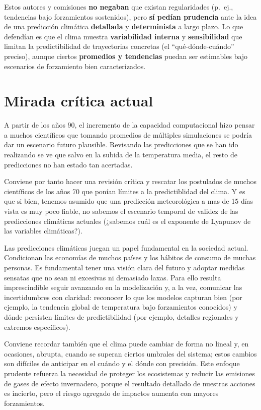 \documentclass[
  11pt,
  a4paper,
  DIV=11,
  numbers=noendperiod]{scrreprt}
\begin{document}
Estos autores y comisiones \textbf{no negaban} que existan regularidades
(p.~ej., tendencias bajo forzamientos sostenidos), pero \textbf{sí
pedían prudencia} ante la idea de una predicción climática
\textbf{detallada} y \textbf{determinista} a largo plazo. Lo que
defendían es que el clima muestra \textbf{variabilidad interna} y
\textbf{sensibilidad} que limitan la predictibilidad de trayectorias
concretas (el ``qué-dónde-cuándo'' preciso), aunque ciertos
\textbf{promedios y tendencias} puedan ser estimables bajo escenarios de
forzamiento bien caracterizados.

\section{Mirada crítica actual}\label{mirada-cruxedtica-actual}

A partir de los años 90, el incremento de la capacidad computacional
hizo pensar a muchos científicos que tomando promedios de múltiples
simulaciones se podría dar un escenario futuro plausible. Revisando las
predicciones que se han ido realizando se ve que salvo en la subida de
la temperatura media, el resto de predicciones no han estado tan
acertadas.

Conviene por tanto hacer una revisión crítica y rescatar los postulados
de muchos científicos de los años 70 que ponían límites a la
predictiblidad del clima. Y es que si bien, tenemos asumido que una
predicción meteorológica a mas de 15 días vista es muy poco fiable, no
sabemos el escenario temporal de validez de las predicciones climáticas
actuales (¿sabemos cuál es el exponente de Lyapunov de las variables
climáticas?).

Las predicciones climáticas juegan un papel fundamental en la sociedad
actual. Condicionan las economías de muchos países y los hábitos de
consumo de muchas personas. Es fundamental tener una visión clara del
futuro y adoptar medidas sensatas que no sean ni excesivas ni demasiado
laxas. Para ello resulta imprescindible seguir avanzando en la
modelización y, a la vez, comunicar las incertidumbres con claridad:
reconocer lo que los modelos capturan bien (por ejemplo, la tendencia
global de temperatura bajo forzamientos conocidos) y dónde persisten
límites de predictibilidad (por ejemplo, detalles regionales y extremos
específicos).

Conviene recordar también que el clima puede cambiar de forma no lineal
y, en ocasiones, abrupta, cuando se superan ciertos umbrales del
sistema; estos cambios son difíciles de anticipar en el cuándo y el
dónde con precisión. Este enfoque prudente refuerza la necesidad de
proteger los ecosistemas y reducir las emisiones de gases de efecto
invernadero, porque el resultado detallado de nuestras acciones es
incierto, pero el riesgo agregado de impactos aumenta con mayores
forzamientos.
\end{document}

